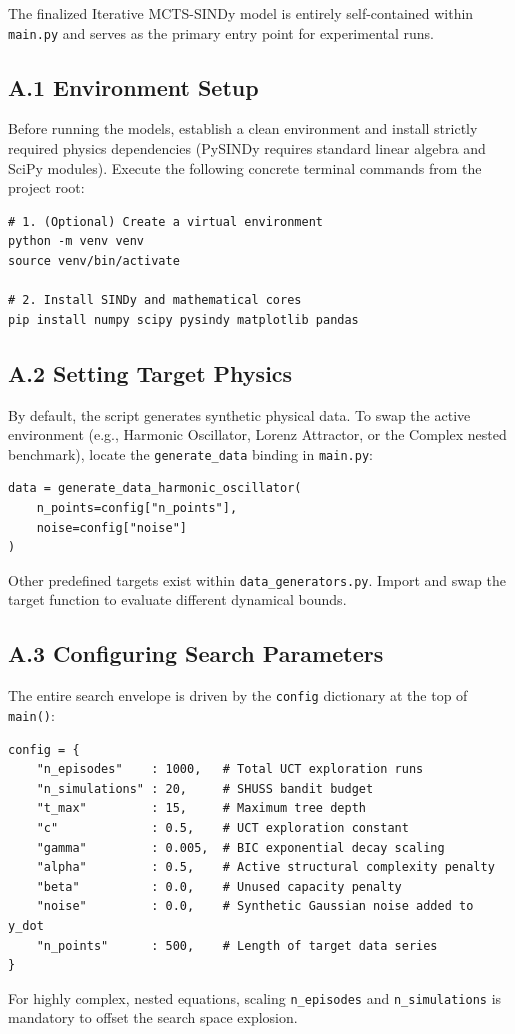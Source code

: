 \documentclass[11pt, a4paper]{article}
\begin{document}
The finalized Iterative MCTS-SINDy model is entirely self-contained within \texttt{main.py} and serves as the primary entry point for experimental runs.

\subsection*{A.1 Environment Setup}
Before running the models, establish a clean environment and install strictly required physics dependencies (PySINDy requires standard linear algebra and SciPy modules). Execute the following concrete terminal commands from the project root:
\begin{verbatim}
# 1. (Optional) Create a virtual environment
python -m venv venv
source venv/bin/activate

# 2. Install SINDy and mathematical cores
pip install numpy scipy pysindy matplotlib pandas
\end{verbatim}

\subsection*{A.2 Setting Target Physics}
By default, the script generates synthetic physical data. To swap the active environment (e.g., Harmonic Oscillator, Lorenz Attractor, or the Complex nested benchmark), locate the \texttt{generate\_data} binding in \texttt{main.py}:
\begin{verbatim}
data = generate_data_harmonic_oscillator(
    n_points=config["n_points"], 
    noise=config["noise"]
)
\end{verbatim}
Other predefined targets exist within \texttt{data\_generators.py}. Import and swap the target function to evaluate different dynamical bounds.

\subsection*{A.3 Configuring Search Parameters}
The entire search envelope is driven by the \texttt{config} dictionary at the top of \texttt{main()}:
\begin{verbatim}
config = {
    "n_episodes"    : 1000,   # Total UCT exploration runs
    "n_simulations" : 20,     # SHUSS bandit budget
    "t_max"         : 15,     # Maximum tree depth
    "c"             : 0.5,    # UCT exploration constant
    "gamma"         : 0.005,  # BIC exponential decay scaling
    "alpha"         : 0.5,    # Active structural complexity penalty
    "beta"          : 0.0,    # Unused capacity penalty
    "noise"         : 0.0,    # Synthetic Gaussian noise added to y_dot
    "n_points"      : 500,    # Length of target data series
}
\end{verbatim}
For highly complex, nested equations, scaling \texttt{n\_episodes} and \texttt{n\_simulations} is mandatory to offset the search space explosion.
\end{document}
